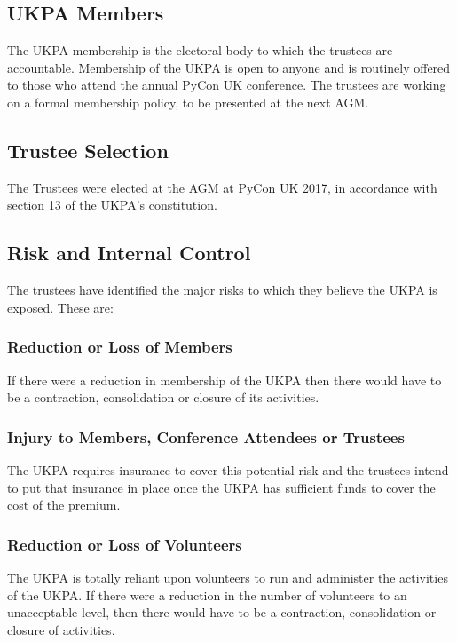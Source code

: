 \documentclass[11pt, final]{article}
\begin{document}
        \subsection{UKPA Members}
        The UKPA membership is the electoral body to which the trustees are accountable.
        Membership of the UKPA is open to anyone and is routinely offered to those who attend the annual PyCon UK conference. The trustees are working on a formal membership policy, to be presented at the next AGM.

        \subsection{Trustee Selection}
        The Trustees were elected at the AGM at PyCon UK 2017, in accordance with section 13 of the UKPA's constitution.

	    \subsection{Risk and Internal Control}
        The trustees have identified the major risks to which they believe the UKPA is exposed. These are:
        
          \subsubsection{Reduction or Loss of Members}
            If there were a reduction in membership of the UKPA then there would have to be a contraction, consolidation or closure of its activities.

            \subsubsection{Injury to Members, Conference Attendees or Trustees}
            The UKPA requires insurance to cover this potential risk and the trustees intend to put that insurance in place once the UKPA has sufficient funds to cover the cost of the premium.
            
            \subsubsection{Reduction or Loss of Volunteers}
            The UKPA is totally reliant upon volunteers to run and administer the activities of the UKPA. If there were a reduction in the number of volunteers to an unacceptable level, then there would have to be a contraction, consolidation or closure of activities.
            
\end{document}
